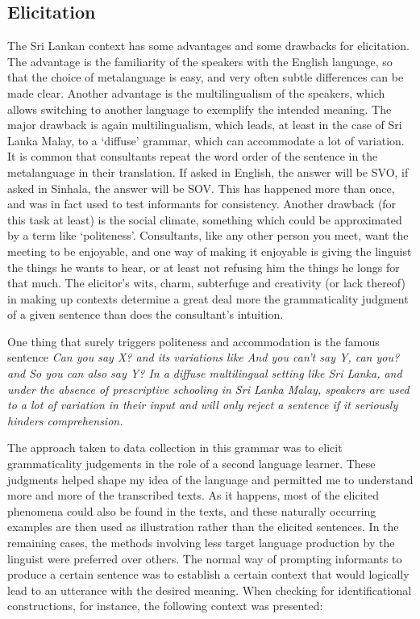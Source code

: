 \subsection{Elicitation}
The Sri Lankan context has some advantages and some drawbacks for elicitation. The advantage is the familiarity of the speakers with the English language, so that the choice of metalanguage is easy, and very often subtle differences can be made clear. Another advantage is the multilingualism of the speakers, which allows switching to another language to exemplify the intended meaning. The major drawback is again multilingualism, which leads, at least in the case of Sri Lanka Malay, to a `diffuse' grammar, which can accommodate a lot of variation. It is common that consultants repeat the word order of the sentence in the metalanguage in their translation. If asked in English, the answer will be SVO, if asked in Sinhala, the answer will be SOV. This has happened more than once, and was in fact used to test informants for consistency. Another drawback (for this task at least) is the social climate, something which could be approximated by a term like `politeness'.  Consultants, like any other person you meet, want the meeting to be enjoyable, and one way of making it enjoyable is giving the linguist the things he wants to hear, or at least not refusing him the things he longs for that much. The elicitor's wits, charm, subterfuge and creativity (or lack thereof) in making up contexts  determine a great deal more the grammaticality judgment of a given sentence than does the consultant's intuition.

One thing that surely triggers politeness and accommodation is the famous sentence \em Can you say X? \em and its variations like \em And you can't say Y, can you? \em and \em So you can also say Y? \em In a diffuse multilingual setting like Sri Lanka, and under the absence of prescriptive schooling in Sri Lanka Malay, speakers are used to a lot of variation in their input and will only reject a sentence if it seriously hinders comprehension.

The approach taken to data collection in this grammar was to elicit grammaticality judgements in the role of a second language learner. These judgments helped shape my idea of the language and permitted me to understand more and more of the transcribed texts. As it happens, most of the elicited phenomena could also be found in the texts, and these naturally occurring examples are then used as illustration rather than the elicited sentences. In the remaining cases, the methods involving less target language production by the linguist were preferred over others. The normal way of prompting informants to produce a certain sentence was to establish a certain context that would logically lead to an utterance with the desired meaning. When checking for identificational constructions, for instance, the following context was presented:

